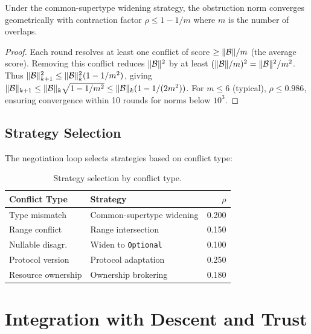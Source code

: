 \documentclass[11pt]{article}
\newcommand{\onorm}{\|\obstr\|}
\begin{document}
\begin{lemma}\label{lem:geom-convergence}
Under the common-supertype widening strategy, the obstruction norm
converges geometrically with contraction factor
$\rho \leq 1 - 1/m$ where $m$ is the number of overlaps.
\end{lemma}

\begin{proof}
Each round resolves at least one conflict of score $\geq \onorm/m$
(the average score).  Removing this conflict reduces $\onorm^2$ by
at least $(\onorm/m)^2 = \onorm^2/m^2$.  Thus
$\onorm_{k+1}^2 \leq \onorm_k^2 (1 - 1/m^2)$, giving
$\onorm_{k+1} \leq \onorm_k \sqrt{1 - 1/m^2}
               \leq \onorm_k (1 - 1/(2m^2))$.
For $m \leq 6$ (typical), $\rho \leq 0.986$, ensuring convergence
within 10 rounds for norms below $10^3$.
\end{proof}

\subsection{Strategy Selection}

The negotiation loop selects strategies based on conflict type:

\begin{table}[H]
\centering
\caption{Strategy selection by conflict type.}\label{tab:strategy}
\begin{tabular}{@{}l l r@{}}
\toprule
\textbf{Conflict Type} & \textbf{Strategy} & $\rho$ \\
\midrule
Type mismatch       & Common-supertype widening & 0.200 \\
Range conflict      & Range intersection        & 0.150 \\
Nullable disagr.    & Widen to \texttt{Optional} & 0.100 \\
Protocol version    & Protocol adaptation       & 0.250 \\
Resource ownership  & Ownership brokering       & 0.180 \\
\bottomrule
\end{tabular}
\end{table}

\section{Integration with Descent and Trust}\label{sec:integration}
\end{document}
